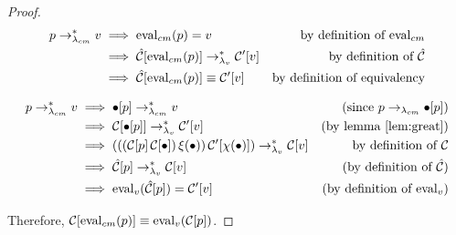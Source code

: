 \begin{proof}

\begin{align*}
p\rightarrow_{\lambda_{cm}}^{*} v &\implies\mathrm{eval}_{cm}(p)=v &\text{by definition of $\mathrm{eval}_{cm}$}\\
          &\implies\hat{\mathcal{C}}[\mathrm{eval}_{cm}(p)]\rightarrow_{\lambda_v}^{*}\mathcal{C}'[v] &\text{by definition of $\hat{\mathcal{C}}$}\\
          &\implies\hat{\mathcal{C}}[\mathrm{eval}_{cm}(p)]\equiv\mathcal{C}'[v] &\text{by definition of equivalency}\\
\end{align*}

\begin{align*}
p\rightarrow_{\lambda_{cm}}^{*} v &\implies\bullet[p]\rightarrow_{\lambda_{cm}}^{*} v &\text{(since $p\rightarrow_{\lambda_{cm}}\bullet[p]$)}\\
          &\implies\mathcal{C}[\bullet[p]]\rightarrow_{\lambda_v}^{*}\mathcal{C}'[v] &\text{(by lemma \ref{lem:great})}\\
          &\implies(((\mathcal{C}[p]\,\mathcal{C}[\bullet])\,\xi(\bullet))\,\mathcal{C}'[\chi(\bullet)])\rightarrow_{\lambda_v}^{*}\mathcal{C}[v]&\text{by definition of $\mathcal{C}$}\\
          &\implies\hat{\mathcal{C}}[p]\rightarrow_{\lambda_v}^{*}\mathcal{C}[v]&\text{(by definition of $\hat{\mathcal{C}}$)}\\
          &\implies\mathrm{eval}_{v}(\hat{\mathcal{C}}[p])=\mathcal{C}'[v] &\text{(by definition of $\mathrm{eval}_v$)}
\end{align*}

Therefore, $\mathcal{C}[\mathrm{eval}_{cm}(p)]\equiv\mathrm{eval}_{v}(\mathcal{C}[p])$.
\end{proof}

